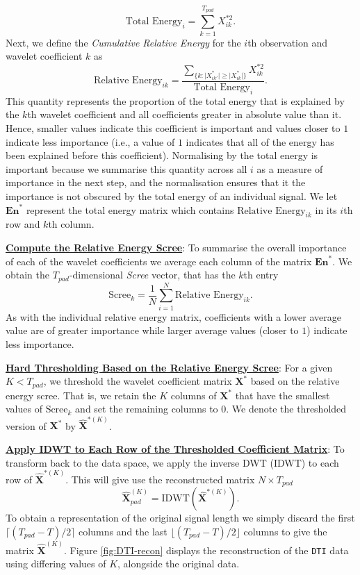 \begin{steps}
  $$\text{Total Energy}_i = \sum_{k=1}^{T_{pad}}X^{*2}_{ik}.$$ Next, we define the \emph{Cumulative Relative Energy} for the $i$th observation and wavelet coefficient $k$ as 
  $$
  \text{Relative Energy}_{ik} = \frac{\sum_{\{k: \lvert X^*_{ik'}\rvert  \geq \lvert X^*_{ik}\rvert \}}X^{*2}_{ik}}{\text{Total Energy}_i}.
  $$
  This quantity represents the proportion of the total energy that is explained by the $k$th wavelet coefficient and all coefficients greater in absolute value than it. Hence, smaller values indicate this coefficient is important and values closer to $1$ indicate less importance (i.e., a value of $1$ indicates that all of the energy has been explained before this coefficient).
  Normalising by the total energy is important because we summarise this quantity across all $i$ as a measure of importance in the next step, and the normalisation ensures that it the importance is not obscured by the total energy of an individual signal. We let $\textbf{En}^*$ represent the total energy matrix which contains $\text{Relative Energy}_{ik}$ in its $i$th row and $k$th column.
  \item \underline{\textbf{Compute the Relative Energy Scree}}: To summarise the overall importance of each of the wavelet coefficients we average each column of the matrix $\textbf{En}^*$. We obtain the $T_{pad}$-dimensional \emph{Scree} vector, that has the $k$th entry
  $$
  \text{Scree}_k = \frac{1}{N} \sum_{i=1}^N \text{Relative Energy}_{ik}.
  $$
  As with the individual relative energy matrix, coefficients with a lower average value are of greater importance while larger average values (closer to $1$) indicate less importance.
  \item \underline{\textbf{Hard Thresholding Based on the Relative Energy Scree}}: For a given $K < T_{pad}$, we threshold the wavelet coefficient matrix $\mathbf{X}^*$ based on the relative energy scree. That is, we retain the $K$ columns of $\mathbf{X}^*$ that have the smallest values of $\text{Scree}_k$ and set the remaining columns to $0$. We denote the thresholded version of $\mathbf{X}^*$ by $\widehat{\mathbf{X}}^{*(K)}$.
  \item \underline{\textbf{Apply IDWT to Each Row of the Thresholded Coefficient Matrix}}: To transform back to the data space, we apply the inverse DWT (IDWT) to each row of $\widehat{\mathbf{X}}^{*(K)}$. This will give use the reconstructed matrix $N \times T_{pad}$
  $$
  \widehat{\mathbf{X}}^{(K)}_{pad} = \text{IDWT}(\widehat{\mathbf{X}}^{*(K)}).
  $$
  To obtain a representation of the original signal length we simply discard the first $\lceil (T_{pad} - T)/2 \rceil$ columns and the last $\lfloor (T_{pad} - T)/2 \rfloor$ columns to give the matrix $\widehat{\mathbf{X}}^{(K)}$. Figure \ref{fig:DTI-recon} displays the reconstruction of the \texttt{DTI} data using differing values of $K$, alongside the original data.

\end{steps}
